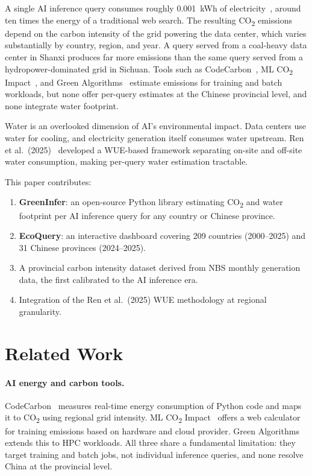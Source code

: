 \documentclass[11pt,a4paper]{article}
\begin{document}
A single AI inference query consumes roughly 0.001~kWh of
electricity~\cite{patterson2021}, around ten times the energy of a
traditional web search. The resulting CO\textsubscript{2} emissions depend
on the carbon intensity of the grid powering the data center, which varies
substantially by country, region, and year. A query served from a
coal-heavy data center in Shanxi produces far more emissions than the same
query served from a hydropower-dominated grid in Sichuan. Tools such as
CodeCarbon~\cite{codecarbon}, ML CO\textsubscript{2}
Impact~\cite{mlco2impact}, and Green Algorithms~\cite{greenalgorithms}
estimate emissions for training and batch workloads, but none offer
per-query estimates at the Chinese provincial level, and none integrate
water footprint.

Water is an overlooked dimension of AI's environmental impact. Data centers
use water for cooling, and electricity generation itself consumes water
upstream. Ren et al.\ (2025)~\cite{ren2025} developed a WUE-based framework
separating on-site and off-site water consumption, making per-query water
estimation tractable.

This paper contributes:
\begin{enumerate}
  \item \textbf{GreenInfer}: an open-source Python library estimating
        CO\textsubscript{2} and water footprint per AI inference query for
        any country or Chinese province.
  \item \textbf{EcoQuery}: an interactive dashboard covering 209 countries
        (2000--2025) and 31 Chinese provinces (2024--2025).
  \item A provincial carbon intensity dataset derived from NBS monthly
        generation data, the first calibrated to the AI inference era.
  \item Integration of the Ren et al.\ (2025) WUE methodology at regional
        granularity.
\end{enumerate}

\section{Related Work}

\paragraph{AI energy and carbon tools.}
CodeCarbon~\cite{codecarbon} measures real-time energy consumption of Python
code and maps it to CO\textsubscript{2} using regional grid intensity.
ML CO\textsubscript{2} Impact~\cite{mlco2impact} offers a web calculator for
training emissions based on hardware and cloud provider.
Green Algorithms~\cite{greenalgorithms} extends this to HPC workloads. All
three share a fundamental limitation: they target training and batch jobs,
not individual inference queries, and none resolve China at the provincial
level.
\end{document}
